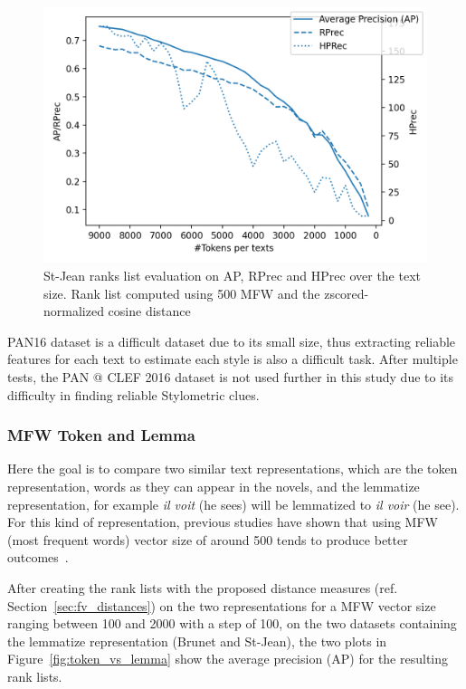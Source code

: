 \begin{figure}
  \centering
  \includegraphics[width=\linewidth]{img/degradation.png}
  \caption{St-Jean ranks list evaluation on AP, RPrec and HPrec over the text size. Rank list computed using 500 MFW and the zscored-normalized cosine distance}
  \label{img:degradation}
\end{figure}

PAN16 dataset is a difficult dataset due to its small size, thus extracting reliable features for each text to estimate each style is also a difficult task.
After multiple tests, the PAN @ CLEF 2016 dataset is not used further in this study due to its difficulty in finding reliable Stylometric clues.

\subsubsection{MFW Token and Lemma}
\label{sec:mfw_token_lemma}

Here the goal is to compare two similar text representations, which are the token representation, words as they can appear in the novels, and the lemmatize representation, for example \textit{il voit} (he sees) will be lemmatized to \textit{il voir} (he see).
For this kind of representation, previous studies have shown that using MFW (most frequent words) vector size of around 500 tends to produce better outcomes~\cite{savoy_text_representation}.

After creating the rank lists with the proposed distance measures (ref. Section~\ref{sec:fv_distances}) on the two representations for a MFW vector size ranging between 100 and 2000 with a step of 100, on the two datasets containing the lemmatize representation (Brunet and St-Jean), the two plots in Figure~\ref{fig:token_vs_lemma} show the average precision (AP) for the resulting rank lists.

